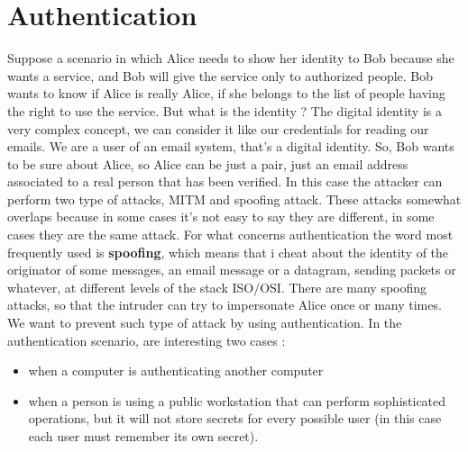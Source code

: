 \documentclass[11pt]{article}
\begin{document}
\section{Authentication}
Suppose a scenario in which Alice needs to show her identity to Bob because she wants a service, and Bob will give the service only to authorized people. Bob wants to know if Alice is really Alice, if she belongs to the list of people having the right to use the service. But what is the identity ? The digital identity is a very complex concept, we can consider it like our credentials for reading our emails. We are a user of an email system, that's a digital identity. So, Bob wants to be sure about Alice, so Alice can be just a pair, just an email address associated to a real person that has been verified. In this case the attacker can perform two type of attacks, MITM and spoofing attack. These attacks somewhat overlaps because in some cases it's not easy to say they are different, in some cases they are the same attack. For what concerns authentication the word most frequently used is \textbf{spoofing}, which means that i cheat about the identity of the originator of some messages, an email message or a datagram, sending packets or whatever, at different levels of the stack ISO/OSI. There are many spoofing attacks, so that the intruder can try to impersonate Alice once or many times. We want to prevent such type of attack by using authentication. In the authentication scenario, are interesting two cases :
\begin{itemize}
\item when a computer is authenticating another computer
\item when a person is using a public workstation that can perform sophisticated operations, but it will not store secrets for every possible user (in this case each user must remember its own secret).
\end{itemize}
\end{document}
